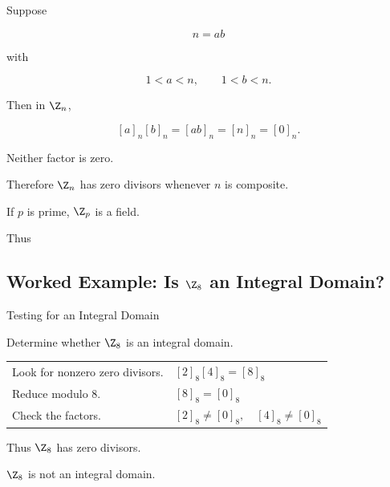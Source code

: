 Suppose

\[ n=ab \]

with

\[ 1<a<n,\qquad1<b<n. \]

Then in \(\Z_n\),

\[ [a]_n[b]_n=[ab]_n=[n]_n=[0]_n. \]

Neither factor is zero.

Therefore \(\Z_n\) has zero divisors whenever \(n\) is composite.

If \(p\) is prime, \(\Z_p\) is a field.

Thus

\begin{center}
\end{center}

\subsection{Worked Example: Is \(\Z_8\) an Integral Domain?}
\label{subsec:worked-z8-domain}

\begin{workedexamplebox}{Testing for an Integral Domain}

Determine whether \(\Z_8\) is an integral domain.

\begin{tabularx}{\textwidth}{@{}>{\raggedright\arraybackslash}p{}X@{}}
Look for nonzero zero divisors. & \([2]_8[4]_8=[8]_8\)\\
Reduce modulo \(8\). & \([8]_8=[0]_8\)\\
Check the factors. & \([2]_8\neq[0]_8,\quad[4]_8\neq[0]_8\)
\end{tabularx}

Thus \(\Z_8\) has zero divisors.

\begin{answerbox}
\(\Z_8\) is not an integral domain.
\end{answerbox}
\end{workedexamplebox}

